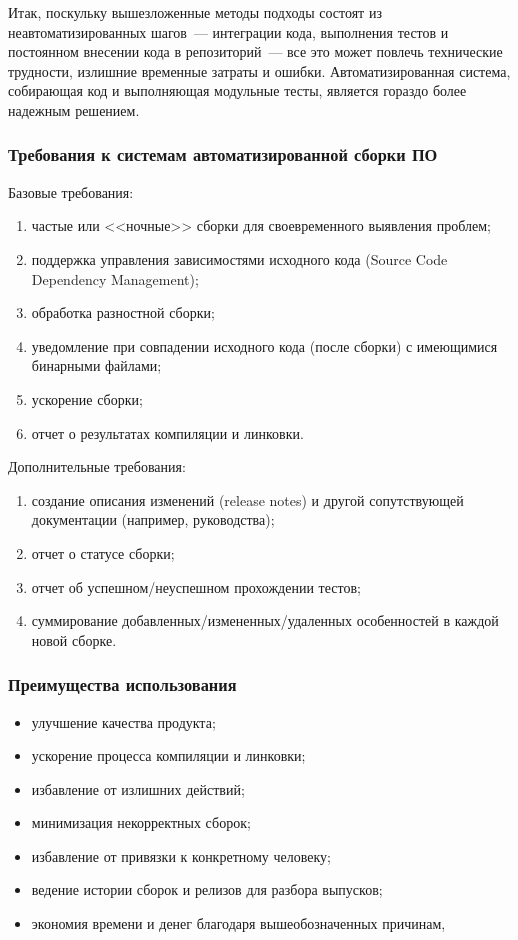 Итак, поскульку вышезложенные методы подходы состоят из неавтоматизированных шагов~--- интеграции кода, выполнения тестов и постоянном внесении кода в репозиторий~--- все это может повлечь технические трудности, излишние временные затраты и ошибки. Автоматизированная система, собирающая код и выполняющая модульные тесты, является гораздо более надежным решением.

\subsubsection{Требования к системам автоматизированной сборки ПО}
Базовые требования:
\begin{enumerate}
\item частые или <<ночные>> сборки для своевременного выявления проблем;
\item поддержка управления зависимостями исходного кода (Source Code Dependency Management);
\item обработка разностной сборки;
\item уведомление при совпадении исходного кода (после сборки) с имеющимися бинарными файлами;
\item ускорение сборки;
\item отчет о результатах компиляции и линковки.
\end{enumerate}

Дополнительные требования:
\begin{enumerate}
\item создание описания изменений (release notes) и другой сопутствующей документации (например, руководства);
\item отчет о статусе сборки;
\item отчет об успешном/неуспешном прохождении тестов;
\item суммирование добавленных/измененных/удаленных особенностей в каждой новой сборке.
\end{enumerate}

\subsubsection{Преимущества использования}
\begin{itemize}
\item улучшение качества продукта;
\item ускорение процесса компиляции и линковки;
\item избавление от излишних действий;
\item минимизация некорректных сборок;
\item избавление от привязки к конкретному человеку;
\item ведение истории сборок и релизов для разбора выпусков;
\item экономия времени и денег благодаря вышеобозначенных причинам,
\end{itemize}

